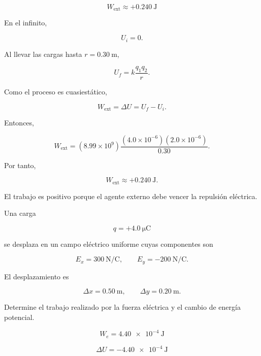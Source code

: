 \begin{respuesta}

\[
\boxed{W_{\text{ext}}\approx+\SI{0.240}{\joule}}
\]

\end{respuesta}

\begin{explicacion}

En el infinito,

\[
U_i=0.
\]

Al llevar las cargas hasta \(r=\SI{0.30}{\metre}\),

\[
U_f=k\frac{q_1q_2}{r}.
\]

Como el proceso es cuasiestático,

\[
W_{\text{ext}}=\Delta U=U_f-U_i.
\]

Entonces,

\[
W_{\text{ext}}
=
(8.99\times10^9)
\frac{(4.0\times10^{-6})(2.0\times10^{-6})}{0.30}.
\]

Por tanto,

\[
\boxed{W_{\text{ext}}\approx+\SI{0.240}{\joule}}.
\]

El trabajo es positivo porque el agente externo debe vencer la repulsión eléctrica.

\end{explicacion}


\begin{ejercicio}

Una carga

\[
q=+\SI{4.0}{\micro\coulomb}
\]

se desplaza en un campo eléctrico uniforme cuyas componentes son

\[
E_x=\SI{300}{\newton\per\coulomb},
\qquad
E_y=-\SI{200}{\newton\per\coulomb}.
\]

El desplazamiento es

\[
\Delta x=\SI{0.50}{\metre},
\qquad
\Delta y=\SI{0.20}{\metre}.
\]

Determine el trabajo realizado por la fuerza eléctrica y el cambio de energía
potencial.

\end{ejercicio}

\begin{respuesta}

\[
\boxed{W_e=\SI{4.40e-4}{\joule}}
\]

\[
\boxed{\Delta U=-\SI{4.40e-4}{\joule}}
\]

\end{respuesta}

